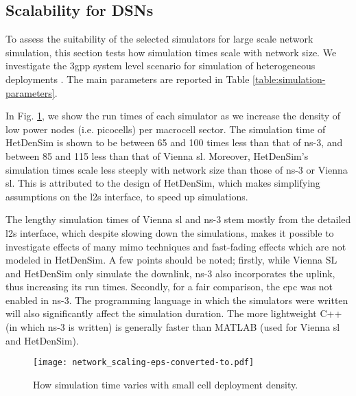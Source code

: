 \documentclass[conference]{IEEEtran}
\begin{document}

\subsection{Scalability for DSNs}\label{subsect:Scalability_for_EDN}
To assess the suitability of the selected simulators for large scale network simulation, this section tests how simulation times scale with
network size.
We investigate the \ac{3gpp} system level scenario for simulation of heterogeneous deployments \cite{3GPP36814}. The main parameters are
reported in Table \ref{table:simulation-parameters}.


In Fig. \ref{fig:edn_scaling}, we show the run times of each simulator as we increase the density of low power nodes (i.e. picocells) per
macrocell sector. The simulation time of HetDenSim is shown to be between 65 and 100 times less than that of ns-3, and between 85 and 115
less than that of Vienna \ac{sl}. Moreover, HetDenSim's simulation times scale less steeply with network size than those of ns-3 or Vienna
\ac{sl}. This is attributed to the design of HetDenSim, which makes simplifying assumptions on the \ac{l2s} interface, to speed up simulations.

The lengthy simulation times of Vienna \ac{sl} and ns-3 stem mostly from the detailed \ac{l2s} interface, which despite slowing down the
simulations, makes it possible to investigate effects of many \ac{mimo} techniques and fast-fading effects which are not modeled in
HetDenSim. A few points should be noted; firstly, while Vienna SL and HetDenSim only simulate the downlink, ns-3 also incorporates the
uplink, thus increasing its run times. Secondly, for a fair comparison, the \ac{epc} was not enabled in ns-3. The programming language in
which the simulators were written will also significantly affect the simulation duration. The more lightweight C++ (in which ns-3 is
written) is generally faster than MATLAB (used for Vienna \ac{sl} and HetDenSim).

\begin{figure}
    \centering
    \texttt{[image: network\_scaling-eps-converted-to.pdf]}
\caption{\footnotesize How simulation time varies with small cell deployment density.}\label{fig:edn_scaling}
    \vspace{-4mm}
\end{figure}
\end{document}
